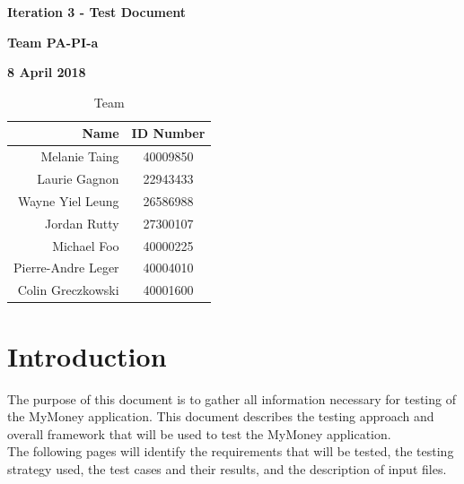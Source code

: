 \documentclass[12pt]{article}
\begin{document}
\vspace*{0.5in}
\centerline{\bf\Large Iteration 3 - Test Document}

\vspace*{0.5in}
\centerline{\bf\Large Team PA-PI-a}

\vspace*{0.5in}
\centerline{\bf\Large 8 April 2018}

\vspace*{1.5in}
\begin{table}[htbp]
\caption{Team}
\begin{center}
\begin{tabular}{|r | c|}
\hline
Name & ID Number \\
\hline\hline
Melanie Taing & 40009850 \\
Laurie Gagnon & 22943433 \\
Wayne Yiel Leung & 26586988 \\
Jordan Rutty & 27300107 \\
Michael Foo & 40000225 \\
Pierre-Andre Leger & 40004010 \\
Colin Greczkowski & 40001600 \\
\hline
\end{tabular}
\end{center}
\end{table}

\clearpage

\pagestyle{plain}

\tableofcontents
\clearpage

\listoffigures
\newpage

\pagestyle{plain}

\section{Introduction}


The purpose of this document is to gather all information necessary for testing of the MyMoney application. This document describes the testing approach and overall framework that will be used to test the MyMoney application.\\

The following pages will identify the requirements that will be tested, the testing strategy used, the test cases and their results, and the description of input files.
\end{document}
